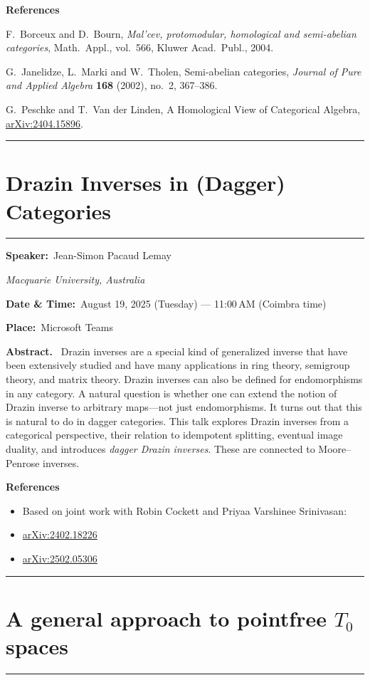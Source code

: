 \documentclass[11pt,a4paper]{article}
\newcommand{\Title}[1]{\section*{#1}\vspace{-0.25em}\hrule\vspace{0.8em}}
\newcommand{\Field}[2]{\textbf{#1:}~#2\par}
\newcommand{\Affil}[1]{\textit{#1}\par}
\newcommand{\Abstract}{\vspace{0.6em}\textbf{Abstract.}~}
\newcommand{\TalkBlockSep}{\vspace{1.25em}\hrule\vspace{1.25em}}
\begin{document}
\medskip
\textbf{References}
\begin{enumerate}[label={[\arabic*]}]
  \item F.~Borceux and D.~Bourn, \emph{Mal'cev, protomodular, homological and semi-abelian categories}, Math.\ Appl., vol.~566, Kluwer Acad.\ Publ., 2004.
  \item G.~Janelidze, L.~Marki and W.~Tholen, Semi-abelian categories, \emph{Journal of Pure and Applied Algebra} \textbf{168} (2002), no.~2, 367--386.
  \item G.~Peschke and T.~Van der Linden, A Homological View of Categorical Algebra, \href{https://arxiv.org/abs/2404.15896}{arXiv:2404.15896}.
\end{enumerate}

\TalkBlockSep

\Title{Drazin Inverses in (Dagger) Categories}

\Field{Speaker}{Jean-Simon Pacaud Lemay}
\Affil{Macquarie University, Australia}

\Field{Date \& Time}{August 19, 2025 (Tuesday) — 11{:}00\,AM (Coimbra time)}
\Field{Place}{Microsoft Teams}

\Abstract
Drazin inverses are a special kind of generalized inverse that have been extensively studied and have many applications in ring theory, semigroup theory, and matrix theory.
Drazin inverses can also be defined for endomorphisms in any category. A natural question is whether one can extend the notion of Drazin inverse to arbitrary maps---not just endomorphisms.
It turns out that this is natural to do in dagger categories. This talk explores Drazin inverses from a categorical perspective, their relation to idempotent splitting, eventual image duality, and introduces \emph{dagger Drazin inverses}. These are connected to Moore--Penrose inverses.

\medskip
\textbf{References}
\begin{itemize}
  \item Based on joint work with Robin Cockett and Priyaa Varshinee Srinivasan:
  \item \href{https://arxiv.org/abs/2402.18226}{arXiv:2402.18226}
  \item \href{https://arxiv.org/abs/2502.05306}{arXiv:2502.05306}
\end{itemize}

\TalkBlockSep

\Title{A general approach to pointfree $T_0$ spaces}
\end{document}
